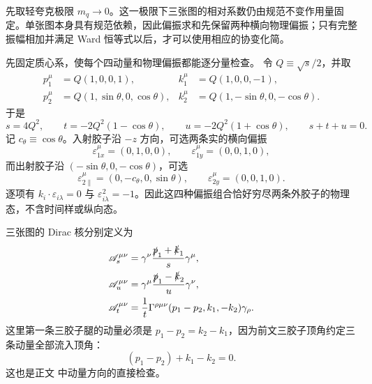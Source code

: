 \begin{derivation}[夸克与胶子散射的通道求和]
先取轻夸克极限 $m_q\to0$。这一极限下三张图的相对系数仍由规范不变作用量固定。单张图本身具有规范依赖，因此偏振求和先保留两种横向物理偏振；只有完整振幅相加并满足 Ward 恒等式以后，才可以使用相应的协变化简。

先固定质心系，使每个四动量和物理偏振都能逐分量检查。
令 $Q\equiv\sqrt{s}/2$，并取
\begin{align*}
 p_1^\mu&=Q(1,0,0,1),&
 k_1^\mu&=Q(1,0,0,-1),\\
 p_2^\mu&=Q(1,\sin\theta,0,\cos\theta),&
 k_2^\mu&=Q(1,-\sin\theta,0,-\cos\theta).
\end{align*}
于是
\begin{equation*}
 s=4Q^2,
 \qquad
 t=-2Q^2(1-\cos\theta),
 \qquad
 u=-2Q^2(1+\cos\theta),
 \qquad s+t+u=0.
\end{equation*}
记 $c_\theta\equiv\cos\theta$。入射胶子沿 $-z$ 方向，可选两条实的横向偏振
\begin{equation*}
 \varepsilon_{1x}^\mu=(0,1,0,0),
 \qquad
 \varepsilon_{1y}^\mu=(0,0,1,0),
\end{equation*}
而出射胶子沿 $(-\sin\theta,0,-\cos\theta)$，可选
\begin{equation*}
 \varepsilon_{2\parallel}^\mu=(0,-c_\theta,0,\sin\theta),
 \qquad
 \varepsilon_{2y}^\mu=(0,0,1,0).
\end{equation*}
逐项有 $k_i\cdot\varepsilon_{i\lambda}=0$ 与 $\varepsilon_{i\lambda}^2=-1$。因此这四种偏振组合恰好穷尽两条外胶子的物理态，不含时间样或纵向态。

三张图的 Dirac 核分别定义为
\begin{align*}
 \mathscr A_s^{\mu\nu}
 &=\gamma^\nu\frac{\slashed p_1+\slashed k_1}{s}\gamma^\mu,\\
 \mathscr A_u^{\mu\nu}
 &=\gamma^\mu\frac{\slashed p_1-\slashed k_2}{u}\gamma^\nu,\\
 \mathscr A_t^{\mu\nu}
 &=\frac1t\Gamma^{\rho\mu\nu}(p_1-p_2,k_1,-k_2)\gamma_\rho.
\end{align*}
这里第一条三胶子腿的动量必须是 $p_1-p_2=k_2-k_1$，因为前文三胶子顶角约定三条动量全部流入顶角：
\begin{equation*}
 (p_1-p_2)+k_1-k_2=0.
\end{equation*}
这也是正文 中动量方向的直接检查。


\end{derivation}
